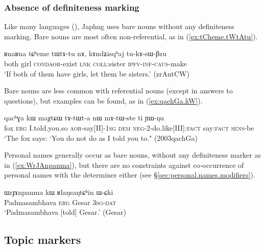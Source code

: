 \subsubsection{Absence of definiteness marking} \label{sec:non.overt.definite}
Like many languages (\citealt[130]{creissels06sgit1}), Japhug uses bare nouns without any definiteness marking. Bare nouns are most often non-referential, as  in (\ref{ex:tCheme.tWtAtu}).

\begin{exe}
\ex \label{ex:tCheme.tWtAtu}
\gll ʁnaʁna tɕʰeme tɯ\redp{}tɤ-tu nɤ, kɤndʑisqʰaj tu-kɤ-sɯ-βzu \\
both girl \textsc{cond}\redp{}\textsc{aor}-exist \textsc{lnk} \textsc{coll}:sister \textsc{ipfv}-\textsc{inf}-\textsc{caus}-make \\
\glt `If both of them have girls, let them be sisters.' (zrAntCW)
\end{exe}

Bare nouns are less common with referential nouns (except in answers to questions), but examples can be found, as  in (\ref{ex:qachGa.kW}).

\begin{exe}
\ex \label{ex:qachGa.kW}
\gll qacʰɣa 	kɯ maχtɕɯ tɤ-tɯt-a nɯ mɤ-tɯ-ste ti ɲɯ-ŋu \\
fox \textsc{erg} I.told.you.so \textsc{aor}-say[II]-\textsc{1sg} \textsc{dem} \textsc{neg}-2-do.like[III]:\textsc{fact} say:\textsc{fact} \textsc{sens}-be \\
\glt `The fox says: `You do not do as I told you to." (2003qachGa)
\end{exe}

Personal names generally occur as bare nouns, without any definiteness marker as in (\ref{ex:WrJAnpanma}), but there are no constraints against co-occurrence of personal names with the determiner  either (see §\ref{sec:personal.names.modifiers}).

\begin{exe}
\ex \label{ex:WrJAnpanma}
\gll  ɯrɟɤnpanma kɯ ʁlaŋsaŋtɕʰin ɯ-ɕki  \\
 Padmasambhava \textsc{erg} Gesar \textsc{3sg}-\textsc{dat} \\
\glt `Padmasambhava [told] Gesar.' (Gesar)
\end{exe}

 \subsection{Topic markers} \label{sec:topic}
 
